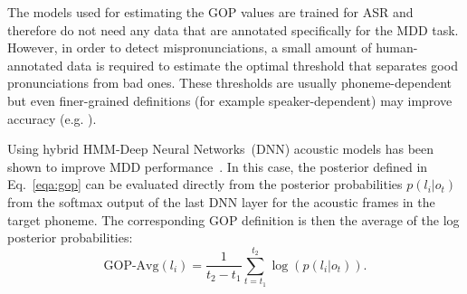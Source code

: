 The models used for estimating the GOP values are trained for ASR and therefore do not need any data that are annotated specifically for the MDD task.
However, in order to detect mispronunciations, 
a small amount of human-annotated data is required to estimate the optimal threshold that separates good pronunciations from bad ones.
These thresholds are usually phoneme-dependent but even finer-grained definitions (for example speaker-dependent) may improve accuracy (e.g. \cite{kanters09_slate}).

Using hybrid HMM-Deep Neural Networks~(DNN) acoustic models has been shown to improve MDD performance~\cite{hu13_interspeech}.
In this case, the posterior defined in Eq.~\ref{eqa:gop} can be evaluated directly from the posterior probabilities $p(l_i|o_t)$ from the softmax output of the last DNN layer for the acoustic frames in the target phoneme.
The corresponding GOP definition is then the average of the log posterior probabilities:
\begin{equation}
    \text{GOP-Avg}(l_i) = \frac{1}{t_2-t_1}\sum_{t=t_1}^{t_2}\log\left({\mathit{p}(l_i|o_t)} \right).
    \label{eqa:gop-dnn}
\end{equation}


